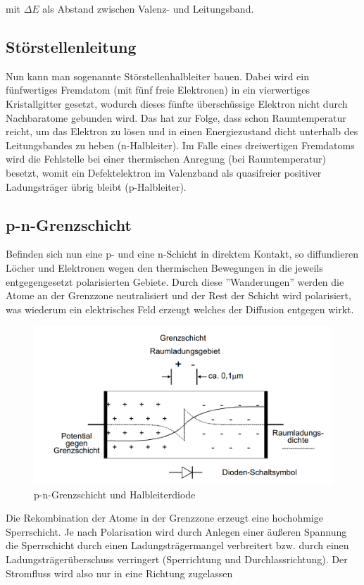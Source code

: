 \documentclass{article}
\begin{document}
mit \(\Delta E\) als Abstand zwischen Valenz- und Leitungsband.

\subsection{Störstellenleitung}
Nun kann man sogenannte Störstellenhalbleiter bauen. Dabei wird ein fünfwertiges Fremdatom (mit fünf freie Elektronen) in ein vierwertiges Kristallgitter gesetzt, wodurch dieses fünfte überschüssige Elektron nicht durch Nachbaratome gebunden wird. Das hat zur Folge, dass schon Raumtemperatur reicht, um das Elektron zu lösen und in einen Energiezustand dicht unterhalb des Leitungsbandes zu heben (n-Halbleiter). Im Falle eines dreiwertigen Fremdatoms wird die Fehlstelle bei einer thermischen Anregung (bei Raumtemperatur) besetzt, womit ein Defektelektron im Valenzband als quasifreier positiver Ladungsträger übrig bleibt (p-Halbleiter).

\subsection{p-n-Grenzschicht}
Befinden sich nun eine p- und eine n-Schicht in direktem Kontakt, so diffundieren Löcher und Elektronen wegen den thermischen Bewegungen in die jeweils entgegengesetzt polarisierten Gebiete. Durch diese ''Wanderungen'' werden die Atome an der Grenzzone neutralisiert und der Rest der Schicht wird polarisiert, was wiederum ein elektrisches Feld erzeugt welches der Diffusion entgegen wirkt.
\begin{figure}[H]
\includegraphics[width=\textwidth]{bilder/tra3}
\caption{p-n-Grenzschicht und Halbleiterdiode}
\end{figure}

Die Rekombination der Atome in der Grenzzone erzeugt eine hochohmige Sperrschicht. Je nach Polarisation wird durch Anlegen einer äußeren Spannung die Sperrschicht durch einen Ladungsträgermangel verbreitert bzw. durch einen Ladungsträgerüberschuss verringert (Sperrichtung und Durchlassrichtung). Der Stromfluss wird also nur in eine Richtung zugelassen
\end{document}
